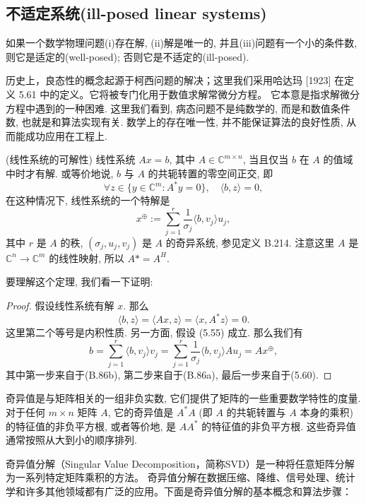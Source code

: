 \documentclass[a4paper]{ctexart}
\newcommand{\hl}[1]
{\noindent {\bf {#1}}}
\begin{document}
{\subsection{不适定系统(ill-posed linear systems)}

\hl{定义5.61} 如果一个数学物理问题(i)存在解, (ii)解是唯一的, 并且(iii)问题有一个小的条件数, 
则它是适定的(well-posed); 否则它是不适定的(ill-posed).

历史上，良态性的概念起源于柯西问题的解决；这里我们采用哈达玛 [1923] 在定义 5.61 中的定义。它将被专门化用于数值求解常微分方程。
它本意是指求解微分方程中遇到的一种困难. 这里我们看到, 病态问题不是纯数学的, 
而是和数值条件数, 也就是和算法实现有关. 数学上的存在唯一性, 并不能保证算法的良好性质, 从而能成功应用在工程上. 

\hl{引理  5.62} (线性系统的可解性) 线性系统 $Ax = b$, 其中 $A \in \mathbb{C}^{m \times n}$, 
当且仅当 $b$ 在 $A$ 的值域中时才有解. 或等价地说, $b$ 与 $A$ 的共轭转置的零空间正交, 即
\begin{equation}
  \forall z \in \{y \in \mathbb{C}^m : A^* y = 0\}, \quad \langle b, z \rangle = 0, \tag{5.59}
\end{equation}
在这种情况下, 线性系统的一个特解是
\[ 
x^{\oplus} := \sum_{j=1}^{r} \frac{1}{\sigma_j} \langle b, v_j \rangle u_j, \tag{5.60}
\]
其中 $r$ 是 $A$ 的秩, $(\sigma_j , u_j , v_j )$ 是 $A$ 的奇异系统, 参见定义 B.214. 
注意这里 $A$ 是 $\mathbb{C}^n \to \mathbb{C}^m$ 的线性映射, 所以 $A* = A^H$.

要理解这个定理, 我们看一下证明: 

\begin{proof}
假设线性系统有解 $x$. 那么
  \[ 
    \langle b, z \rangle = \langle Ax, z \rangle = \langle x, A^* z \rangle = 0. 
  \]
  这里第二个等号是内积性质. 另一方面, 假设 (5.55) 成立. 那么我们有
  \[ 
  b = \sum_{j=1}^{r} \langle b, v_j \rangle v_j 
  = \sum_{j=1}^{r} \frac{1}{\sigma_j} \langle b, v_j \rangle A u_j 
  = Ax^{\oplus}, 
  \]
其中第一步来自于(B.86b), 第二步来自于(B.86a), 最后一步来自于(5.60). 
\end{proof}

奇异值是与矩阵相关的一组非负实数, 它们提供了矩阵的一些重要数学特性的度量. 
对于任何 $m \times n$ 矩阵 $A$, 它的奇异值是 $A^*A$ (即 $A$ 的共轭转置与 $A$ 本身的乘积) 
的特征值的非负平方根, 或者等价地, 是 $AA^*$ 的特征值的非负平方根. 
这些奇异值通常按照从大到小的顺序排列. 

奇异值分解（Singular Value Decomposition，简称SVD）是一种将任意矩阵分解为一系列特定矩阵乘积的方法。
奇异值分解在数据压缩、降维、信号处理、统计学和许多其他领域都有广泛的应用。下面是奇异值分解的基本概念和算法步骤：

}
\end{document}
